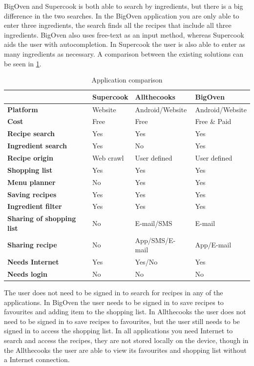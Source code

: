 BigOven and Supercook is both able to search by ingredients, but there is a big difference in the two searches. In the BigOven application you are only able to enter three ingredients, the search finds all the recipes that include all three ingredients. BigOven also uses free-text as an input method, whereas Supercook aids the user with autocompletion. In Supercook the user is also able to enter as many ingredients as necessary.
A comparison between the existing solutions can be seen in \ref{tab:appcomparison}.
\begin{table}[H]
\centering
\begin{tabular}{|>{\bfseries}p{3.0cm}|l|l|l|}
\hline
 & \textbf{Supercook} & \textbf{Allthecooks} & \textbf{BigOven} \\
\hline
Platform & Website & Android/Website & Android/Website \\
\hline
Cost & Free & Free & Free \& Paid \\
\hline
Recipe search & Yes & Yes & Yes  \\
\hline
Ingredient search & Yes & No & Yes \\
\hline
Recipe origin & Web crawl & User defined & User defined \\
\hline
Shopping list & Yes & Yes & Yes \\
\hline
Menu planner & No & Yes & Yes \\
\hline
Saving recipes & Yes & Yes & Yes \\
\hline
Ingredient filter & Yes & Yes & Yes \\
\hline
Sharing of shopping list & No & E-mail/SMS & E-mail \\
\hline
Sharing recipe & No & App/SMS/E-mail & App/E-mail \\
\hline
Needs Internet & Yes & Yes/No & Yes \\
\hline
Needs login & No & No & No \\
\hline
\end{tabular}
\caption{Application comparison}
\label{tab:appcomparison}
\end{table}
The user does not need to be signed in to search for recipes in any of the applications. 
In BigOven the user needs to be signed in to save recipes to favourites and adding item to the shopping list. 
In Allthecooks the user does not need to be signed in to save recipes to favourites, but the user still needs to be signed in to access the shopping list.  
In all applications you need Internet to search and access the recipes, they are not stored locally on the device, though in the Allthecooks the user are able to view its favourites and shopping list without a Internet connection.

